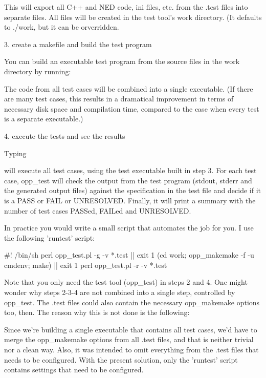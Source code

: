   This will export all C++ and NED code, ini files, etc. from
  the .test files into separate files. All files will be created
  in the test tool's work directory. (It defaults to ./work,
  but it can be orverridden.

3. create a makefile and build the test program

  You can build an executable test program from the source files
  in the work directory by running:

\begin{filelisting}
\end{filelisting}

  The code from all test cases will be combined into a single executable.
  (If there are many test cases, this results in a dramatical
  improvement in terms of necessary disk space and compilation time,
  compared to the case when every test is a separate executable.)

4. execute the tests and see the results

  Typing

\begin{filelisting}
\end{filelisting}

  will execute all test cases, using the test executable built
  in step 3. For each test case, opp\_test will check the output from
  the test program (stdout, stderr and the generated output files)
  against the specification in the test file and decide if it is
  a PASS or FAIL or UNRESOLVED. Finally, it will print a summary
  with the number of test cases PASSed, FAILed and UNRESOLVED.

In practice you would write a small script that automates the job
for you. I use the following 'runtest' script:

\begin{filelisting}
  #! /bin/sh
  perl opp\_test.pl -g -v *.test || exit 1
  (cd work; opp_makemake -f -u cmdenv; make) || exit 1
  perl opp_test.pl -r -v *.test
\end{filelisting}

Note that you only need the test tool (opp\_test) in steps 2 and 4.
One might wonder why steps 2-3-4 are not combined into a single
step, controlled by opp\_test. The .test files could also contain
the necessary opp\_makemake options too, then. The reason why this is
not done is the following:

Since we're building a single executable that contains all
test cases, we'd have to merge the opp\_makemake options from
all .test files, and that is neither trivial nor a clean way.
Also, it was intended to omit everything from the .test files
that needs to be configured. With the present solution,
only the 'runtest' script contains settings that need to
be configured.

